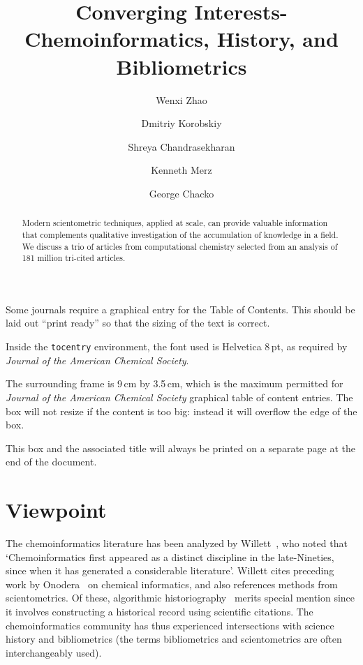 \documentclass[journal=jcdis8,manuscript=article]{achemso}
\author{Wenxi Zhao}
\author{Dmitriy Korobskiy}
\author{Shreya Chandrasekharan}
\affiliation[NET ESolutions Corporation (an NTT DATA Company)]{Netelabs, NET ESolutions Corporation, VA, USA}
\author{Kenneth Merz}
\affiliation[Michigan State University]{Department of Chemistry, Michigan State University, MI, USA}
\author{George Chacko}
\affiliation[University of Illinois Urbana-Champaign]{Dept. of Computer Science, University of Illinois Urbana-Champaign, IL, USA}
\title{Converging Interests- Chemoinformatics, History, and Bibliometrics}
\begin{document}

\begin{tocentry}
Some journals require a graphical entry for the Table of Contents.
This should be laid out ``print ready'' so that the sizing of the
text is correct.

Inside the \texttt{tocentry} environment, the font used is Helvetica
8\,pt, as required by \emph{Journal of the American Chemical
Society}.

The surrounding frame is 9\,cm by 3.5\,cm, which is the maximum
permitted for  \emph{Journal of the American Chemical Society}
graphical table of content entries. The box will not resize if the
content is too big: instead it will overflow the edge of the box.

This box and the associated title will always be printed on a
separate page at the end of the document.

\end{tocentry}

\begin{abstract}

Modern scientometric techniques, applied at scale, can provide valuable information that complements qualitative investigation of the accumulation of knowledge in a field. We discuss a trio of articles from computational chemistry selected from an analysis of 181 million tri-cited 
articles. 

\end{abstract}

\section{Viewpoint}

The chemoinformatics literature has been analyzed by Willett~\citep{willett2008}, who noted that  `Chemoinformatics first appeared as a distinct discipline in the late-Nineties, since when it has generated a considerable literature'. Willett cites preceding work by Onodera~\citep{onodera2003} on chemical informatics, and also references methods from scientometrics. Of these, algorithmic historiography~\citep{garfield2004} merits special mention since it involves constructing a historical record using scientific citations. The chemoinformatics community has thus experienced intersections with science history and bibliometrics (the terms bibliometrics and scientometrics are often interchangeably used). 
\end{document}
